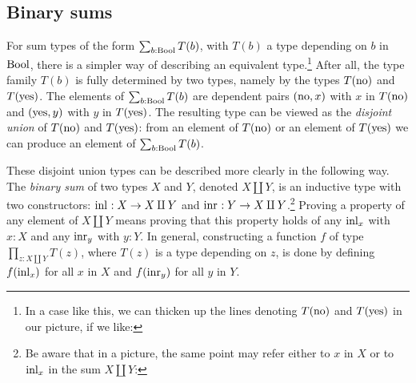 \subsection{Binary sums}
\label{sec:binsum-types}
For sum types of the form $\sum_{b:\mathrm{Bool}} T(b)$, with $T(b)$
a type depending on $b$ in $\mathrm{Bool}$, there is a simpler way of
describing an equivalent type.\footnote{%
  In a case like this, we can thicken up the lines denoting
  $T(\mathrm{no})$ and $T(\mathrm{yes})$ in our picture, if we like:\par
  }
After all, the type family $T(b)$ is fully determined
by two types, namely by the types $T(\mathrm{no})$ and $T(\mathrm{yes})$.
The elements of $\sum_{b:\mathrm{Bool}} T(b)$ are dependent pairs $(\mathrm{no},x)$ with
$x$ in $T(\mathrm{no})$ and $(\mathrm{yes},y)$ with $y$ in $T(\mathrm{yes})$. The resulting
type can be viewed as the \emph{disjoint union} of $T(\mathrm{no})$ and $T(\mathrm{yes})$:
from an element of $T(\mathrm{no})$ or an element of $T(\mathrm{yes})$
we can produce an element of $\sum_{b:\mathrm{Bool}} T(b)$.

These disjoint union types can be described more clearly in the following way.
The \emph{binary sum} of two types $X$ and $Y$, denoted $X \amalg Y$,
is an inductive type with two constructors: $\inl{} : X \to X \amalg Y$ and
$\inr{} : Y \to X \amalg Y$.\footnote{%
  Be aware that in a picture, the same point may refer
  either to $x$ in $X$ or to $\inl x$ in the sum $X \amalg Y$:\par
  }
Proving a property of any element of $X \amalg Y$
means proving that this property holds of any $\inl{x}$ with $x:X$ and any
$\inr{y}$ with $y:Y$. In general, constructing a function $f$ of type
$\prod_{z: X \amalg Y} T(z)$, where $T(z)$ is a type depending on
$z$, is done by defining $f(\inl{x})$ for all $x$ in $X$
and $f(\inr{y})$ for all $y$ in $Y$.

